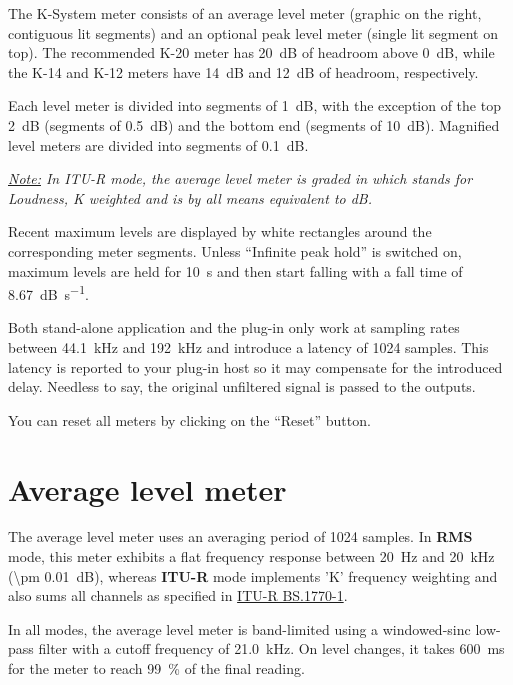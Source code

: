 The K-System meter consists of an average level meter (graphic on the
right, contiguous lit segments) and an optional peak level meter
(single lit segment on top).  The recommended K-20 meter has
\SI{20}{\dB} of headroom above \SI{0}{\dB}, while the K-14 and K-12
meters have \SI{14}{\dB} and \SI{12}{\dB} of headroom, respectively.

Each level meter is divided into segments of \SI{1}{\dB}, with the
exception of the top \SI{2}{\dB} (segments of \SI{0.5}{\dB}) and the
bottom end (segments of \SI{10}{\dB}).  Magnified level meters are
divided into segments of \SI{0.1}{\dB}.

\emph{\underline{Note:} In ITU-R mode, the average level meter is
  graded in \emph{\si{\LK}} which stands for \emph{Loudness, K
    weighted} and is by all means equivalent to \si{\dB}.}

Recent maximum levels are displayed by white rectangles around the
corresponding meter segments.  Unless ``Infinite peak hold'' is
switched on, maximum levels are held for \SI{10}{\second} and then
start falling with a fall time of \SI{8.67}{\dB\per\second}.

Both stand-alone application and the plug-in only work at sampling
rates between \SI{44.1}{\kilo\hertz} and \SI{192}{\kilo\hertz} and
introduce a latency of \num{1024} samples.  This latency is reported
to your plug-in host so it may compensate for the introduced delay.
Needless to say, the original unfiltered signal is passed to the
outputs.

You can reset all meters by clicking on the ``Reset'' button.

\section{Average level meter}

The average level meter uses an averaging period of \num{1024}
samples.  In \textbf{RMS} mode, this meter exhibits a flat frequency
response between \SI{20}{\hertz} and \SI{20}{\kilo\hertz} (\SI{\pm
  0.01}{\dB}), whereas \textbf{ITU-R} mode implements 'K' frequency
weighting and also sums all channels as specified in
\href{http://www.itu.int/rec/R-REC-BS.1770}{ITU-R BS.1770-1}.

In all modes, the average level meter is band-limited using a
windowed-sinc low-pass filter with a cutoff frequency of
\SI{21.0}{\kilo\hertz}.  On level changes, it takes
\SI{600}{\milli\second} for the meter to reach \SI{99}{\percent} of
the final reading.

